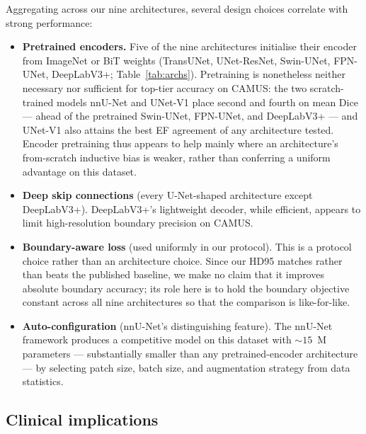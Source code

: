 Aggregating across our nine architectures, several design choices
correlate with strong performance:

\begin{itemize}[leftmargin=*,nosep]
\item \textbf{Pretrained encoders.} Five of the nine architectures
      initialise their encoder from ImageNet or BiT weights (TransUNet,
      UNet-ResNet, Swin-UNet, FPN-UNet, DeepLabV3+; Table~\ref{tab:archs}).
      Pretraining is nonetheless neither necessary nor sufficient for
      top-tier accuracy on CAMUS: the two scratch-trained models nnU-Net and
      UNet-V1 place second and fourth on mean Dice --- ahead of the
      pretrained Swin-UNet, FPN-UNet, and DeepLabV3+ --- and UNet-V1 also
      attains the best EF agreement of any architecture tested. Encoder
      pretraining thus appears to help mainly where
      an architecture's from-scratch inductive bias is weaker, rather than
      conferring a uniform advantage on this dataset.
\item \textbf{Deep skip connections} (every U-Net-shaped architecture
      except DeepLabV3+). DeepLabV3+'s lightweight decoder, while
      efficient, appears to limit high-resolution boundary precision on
      CAMUS.
\item \textbf{Boundary-aware loss} (used uniformly in our protocol).
      This is a protocol choice rather than an architecture choice. Since
      our HD95 matches rather than beats the published baseline, we make
      no claim that it improves absolute boundary accuracy; its role here
      is to hold the boundary objective constant across all nine
      architectures so that the comparison is like-for-like.
\item \textbf{Auto-configuration} (nnU-Net's distinguishing feature).
      The nnU-Net framework produces a competitive model on this dataset
      with $\sim$$15$~M parameters --- substantially smaller than any
      pretrained-encoder architecture --- by selecting patch size, batch
      size, and augmentation strategy from data statistics.
\end{itemize}

\subsection{Clinical implications}
\label{sec:disc-clinical}

